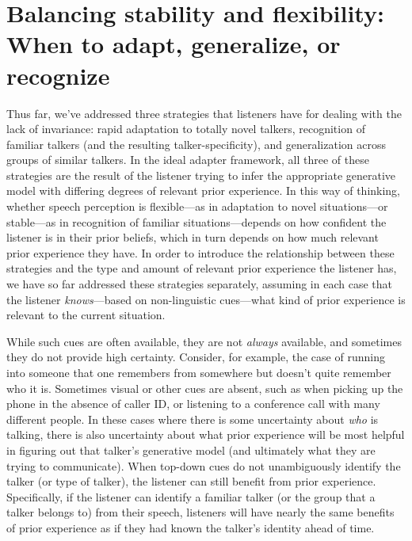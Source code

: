\label{r1-gen-questions-end}

\section{Balancing stability and flexibility: When to adapt, generalize, or recognize}
\label{sec:when-adapt-gener}

Thus far, we've addressed three strategies that listeners have for dealing with the lack of invariance: rapid adaptation to totally novel talkers, recognition of familiar talkers (and the resulting talker-specificity), and generalization across groups of similar talkers.  In the ideal adapter framework, all three of these strategies are the result of the listener trying to infer the appropriate generative model with differing degrees of relevant prior experience.  In this way of thinking, whether speech perception is flexible---as in adaptation to novel situations---or stable---as in recognition of familiar situations---depends on how confident the listener is in their prior beliefs, which in turn depends on how much relevant prior experience they have. 
In order to introduce the relationship between these strategies and the type and amount of relevant prior experience the listener has, we have so far addressed these strategies separately, assuming in each case that the listener \emph{knows}---based on non-linguistic cues---what kind of prior experience is relevant to the current situation.

While such cues are often available, they are not \emph{always} available, and sometimes they do not provide high certainty. Consider, for example, the case of running into someone that one remembers from somewhere but doesn't quite remember who it is. Sometimes visual or other cues are absent, such as when picking up the phone in the absence of caller ID, or listening to a conference call with many different people.  In these cases where there is some uncertainty about \emph{who} is talking, there is also uncertainty about what prior experience will be most helpful in figuring out that talker's generative model (and ultimately what they are trying to communicate).  When top-down cues do not unambiguously identify the talker (or type of talker), the listener can still benefit from prior experience. Specifically, if the listener can identify a familiar talker (or the group that a talker belongs to) from their speech, listeners will have nearly the same benefits of prior experience as if they had known the talker's identity ahead of time.

